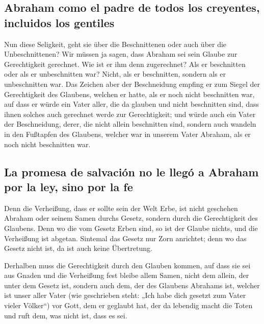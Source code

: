 \hypertarget{abraham-como-el-padre-de-todos-los-creyentes-incluidos-los-gentiles}{%
\subsection{Abraham como el padre de todos los creyentes, incluidos los
gentiles}\label{abraham-como-el-padre-de-todos-los-creyentes-incluidos-los-gentiles}}

 Nun diese Seligkeit, geht sie über die Beschnittenen oder
auch über die Unbeschnittenen? Wir müssen ja sagen, dass Abraham sei
sein Glaube zur Gerechtigkeit gerechnet.  Wie ist er ihm
denn zugerechnet? Als er beschnitten oder als er unbeschnitten war?
Nicht, als er beschnitten, sondern als er unbeschnitten war.
 Das Zeichen aber der Beschneidung empfing er zum Siegel
der Gerechtigkeit des Glaubens, welchen er hatte, als er noch nicht
beschnitten war, auf dass er würde ein Vater aller, die da glauben und
nicht beschnitten sind, dass ihnen solches auch gerechnet werde zur
Gerechtigkeit;  und würde auch ein Vater der
Beschneidung, derer, die nicht allein beschnitten sind, sondern auch
wandeln in den Fußtapfen des Glaubens, welcher war in unserem Vater
Abraham, als er noch nicht beschnitten war.

\hypertarget{la-promesa-de-salvaciuxf3n-no-le-lleguxf3-a-abraham-por-la-ley-sino-por-la-fe}{%
\subsection{La promesa de salvación no le llegó a Abraham por la ley,
sino por la
fe}\label{la-promesa-de-salvaciuxf3n-no-le-lleguxf3-a-abraham-por-la-ley-sino-por-la-fe}}

 Denn die Verheißung, dass er sollte sein der Welt Erbe,
ist nicht geschehen Abraham oder seinem Samen durchs Gesetz, sondern
durch die Gerechtigkeit des Glaubens.  Denn wo die vom
Gesetz Erben sind, so ist der Glaube nichts, und die Verheißung ist
abgetan.  Sintemal das Gesetz nur Zorn anrichtet; denn wo
das Gesetz nicht ist, da ist auch keine Übertretung.

 Derhalben muss die Gerechtigkeit durch den Glauben
kommen, auf dass sie sei aus Gnaden und die Verheißung fest bleibe allem
Samen, nicht dem allein, der unter dem Gesetz ist, sondern auch dem, der
des Glaubens Abrahams ist, welcher ist unser aller Vater 
(wie geschrieben steht: „Ich habe dich gesetzt zum Vater vieler
Völker``) vor Gott, dem er geglaubt hat, der da lebendig macht die Toten
und ruft dem, was nicht ist, dass es sei.

